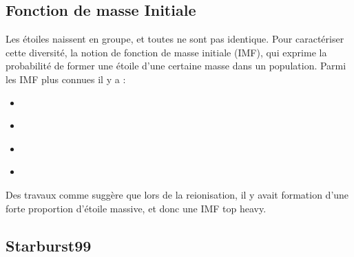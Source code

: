 


\subsection{Fonction de masse Initiale}

Les étoiles naissent en groupe, et toutes ne sont pas identique.
Pour caractériser cette diversité, la notion de fonction de masse initiale (\ac{IMF}), qui exprime la probabilité de former une étoile d'une certaine masse dans un population.
Parmi les \ac{IMF} plus connues il y a :

\begin{itemize}
\item \cite{1955ApJ...121..161S}
\item \cite{1979ApJS...41..513M}
\item \cite{2001MNRAS.322..231K}
\item \cite{2003PASP..115..763C}
\end{itemize}


Des travaux comme \cite{2003MNRAS.344L...7C} suggère que lors de la reionisation, il y avait formation d'une forte proportion d'étoile massive, et donc une \ac{IMF} top heavy.



\subsection{Starburst99}
\label{sec:staburst}

